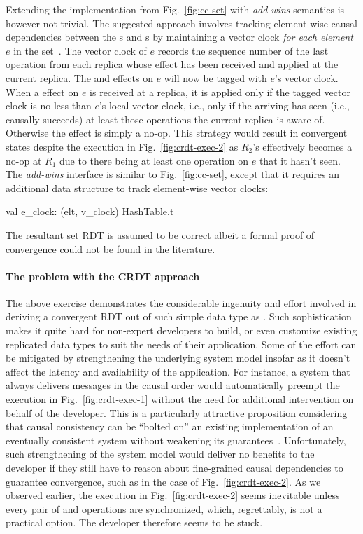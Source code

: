 Extending the  implementation from Fig.~\ref{fig:cc-set} with
\emph{add-wins} semantics is however not trivial. The suggested
approach involves tracking element-wise causal dependencies between
the s and s by maintaining a vector clock \emph{for
each element} $e$ in the set~\cite{zawirski-thesis}. The vector clock
of $e$ records the sequence number of the last  operation
from each replica whose effect has been received and applied at the
current replica. The  and  effects on $e$ will now be
tagged with $e$'s vector clock. When a  effect on $e$ is
received at a replica, it is applied only if the tagged vector clock
is no less than $e$'s local vector clock, i.e., only if the arriving
 has seen (i.e., causally succeeds) at least those
 operations the current replica is aware of.  Otherwise
the effect is simply a no-op. This strategy would result in convergent
states despite the execution in Fig.~\ref{fig:crdt-exec-2} as $R_2$'s
 effectively becomes a no-op at $R_1$ due to there being at
least one  operation on $e$ that it hasn't seen. The
\emph{add-wins}  interface is similar to Fig.~\ref{fig:cc-set},
except that it requires an additional data structure to track
element-wise vector clocks: 
\begin{ocaml}
  val e_clock: (elt, v_clock) HashTable.t
\end{ocaml}
The resultant set RDT is assumed to be correct albeit a formal proof
of convergence could not be found in the literature. 

\noindent\paragraph{The problem with the CRDT approach} The above
exercise demonstrates the considerable ingenuity and effort involved
in deriving a convergent RDT out of such simple data type as .
Such sophistication makes it quite hard for non-expert developers to
build, or even customize existing replicated data types to suit the
needs of their application. Some of the effort can be mitigated by
strengthening the underlying system model insofar as it doesn't affect
the latency and availability of the application. For instance, a
system that always delivers messages in the causal order would
automatically preempt the execution in Fig.~\ref{fig:crdt-exec-1}
without the need for additional intervention on behalf of the
developer. This is a particularly attractive proposition considering
that causal consistency can be ``bolted on'' an existing
implementation of an eventually consistent system without weakening
its guarantees~\cite{BoltOn}. Unfortunately, such strengthening of the
system model would deliver no benefits to the developer if they still
have to reason about fine-grained causal dependencies to guarantee
convergence, such as in the case of Fig.~\ref{fig:crdt-exec-2}. As we
observed earlier, the execution in Fig.~\ref{fig:crdt-exec-2} seems
inevitable unless every pair of  and  operations are
synchronized, which, regrettably, is not a practical option. The
developer therefore seems to be stuck.

